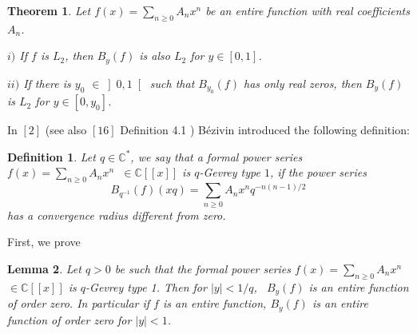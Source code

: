 \documentclass{article}
\newtheorem{theorem}{Theorem}[section]
\newtheorem{definition}{Definition}
\newtheorem{lemma}[theorem]{Lemma}
\begin{document}
\begin{theorem}
\bigskip \bigskip Let $f\left( x\right) =\sum_{n\geq 0}A_{n}x^{n}$ be an
entire function with real coefficients $A_{n}$.

$i)$ If $f$ is $L_{2}$, then $B_{y}\left( f\right) $ is also $L_{2}$ for $y\in \left[ 0,1\right] $.

$ii)$ If there is $y_{0}$ $\in \left] 0,1\right[ $ such that $B_{y_{0}}\left( f\right) $ has only real zeros, then $B_{y}\left( f\right) $
is $L_{2}$ for $y\in \left[ 0,y_{0}\right] $.
\end{theorem}

\bigskip

In $\left[ 2\right] $ (see also $\left[ 16\right] $ Definition 4.1 )
B\'{e}zivin introduced the following definition:

\begin{definition}
Let $q\in \mathbb{C}^{\ast }$, we say that a formal power series $f\left(
x\right) =\sum_{n\geq 0}A_{n}x^{n}$\textbf{\ }$\in \mathbb{C}\left[ \left[ x\right] \right] $ is $q$-Gevrey type $1$, if the power series 
\begin{equation*}
B_{q^{-1}}\left( f\right) \left( xq\right) =\sum_{n\geq
0}A_{n}x^{n}q^{-n\left( n-1\right) /2}
\end{equation*}
has a convergence radius different from zero.
\end{definition}

\bigskip First, we prove

\begin{lemma}
Let $q>0$ be such that the formal power series $f\left( x\right)
=\sum_{n\geq 0}A_{n}x^{n}$ $\in \mathbb{C}\left[ \left[ x\right] \right] $
is $q$-Gevrey type 1. Then for $\left| y\right| <1/q$, \ $B_{y}\left(
f\right) $ is an entire function of order zero. In particular if $f$ is an
entire function, $B_{y}\left( f\right) $ is an entire function of order zero
for $\left| y\right| <1$.
\end{lemma}
\end{document}
